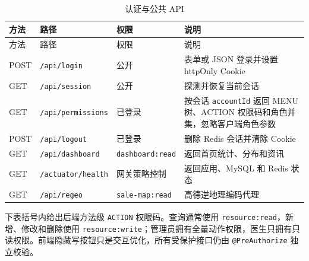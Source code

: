 \documentclass[UTF8,a4paper,12pt,openany,fontset=windows]{ctexrep}
\begin{document}
\begin{longtable}{p{2.1cm}p{4.8cm}p{2.4cm}p{4.2cm}}
  \caption{认证与公共 API}\label{tab:public-api}\\
  \toprule
  方法 & 路径 & 权限 & 说明 \\
  \midrule
  \endfirsthead
  \toprule
  方法 & 路径 & 权限 & 说明 \\
  \midrule
  \endhead
  POST & \texttt{/api/login} & 公开 & 表单或 JSON 登录并设置 httpOnly Cookie \\
  GET & \texttt{/api/session} & 公开 & 探测并恢复当前会话 \\
  GET & \texttt{/api/permissions} & 已登录 & 按会话 \texttt{accountId} 返回 MENU 树、ACTION 权限码和角色并集，忽略客户端角色参数 \\
  POST & \texttt{/api/logout} & 已登录 & 删除 Redis 会话并清除 Cookie \\
  GET & \texttt{/api/dashboard} & \texttt{dashboard:read} & 返回首页统计、分布和资讯 \\
  GET & \texttt{/actuator/health} & 网关策略控制 & 返回应用、MySQL 和 Redis 状态 \\
  GET & \texttt{/api/regeo} & \texttt{sale-map:read} & 高德逆地理编码代理 \\
  \bottomrule
\end{longtable}

下表括号内给出后端方法级 \texttt{ACTION} 权限码。查询通常使用 \texttt{resource:read}，新增、修改和删除使用 \texttt{resource:write}；管理员拥有全量动作权限，医生只拥有只读权限。前端隐藏写按钮只是交互优化，所有受保护接口仍由 \texttt{@PreAuthorize} 独立校验。
\end{document}

